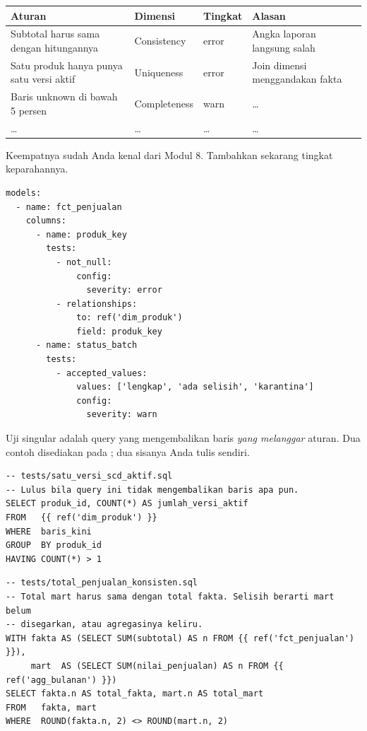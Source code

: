 \begin{center}
\small
\begin{tabular}{@{}p{}p{}p{}>{\raggedright\arraybackslash}p{}@{}}
\toprule
\textbf{Aturan} & \textbf{Dimensi} & \textbf{Tingkat} & \textbf{Alasan} \\
\midrule
Subtotal harus sama dengan hitungannya & Consistency & error &
  Angka laporan langsung salah \\
Satu produk hanya punya satu versi aktif & Uniqueness & error &
  Join dimensi menggandakan fakta \\
Baris unknown di bawah 5 persen & Completeness & warn &
  \ldots \\
\ldots & \ldots & \ldots & \ldots \\
\bottomrule
\end{tabular}
\end{center}


Keempatnya sudah Anda kenal dari Modul 8. Tambahkan sekarang tingkat
keparahannya.

\begin{lstlisting}[style=yamlgaya]
models:
  - name: fct_penjualan
    columns:
      - name: produk_key
        tests:
          - not_null:
              config:
                severity: error
          - relationships:
              to: ref('dim_produk')
              field: produk_key
      - name: status_batch
        tests:
          - accepted_values:
              values: ['lengkap', 'ada selisih', 'karantina']
              config:
                severity: warn
\end{lstlisting}


Uji singular adalah query yang mengembalikan baris \emph{yang melanggar}
aturan. Dua contoh disediakan pada ; dua sisanya
Anda tulis sendiri.

\begin{lstlisting}[style=sqlgaya]
-- tests/satu_versi_scd_aktif.sql
-- Lulus bila query ini tidak mengembalikan baris apa pun.
SELECT produk_id, COUNT(*) AS jumlah_versi_aktif
FROM   {{ ref('dim_produk') }}
WHERE  baris_kini
GROUP  BY produk_id
HAVING COUNT(*) > 1
\end{lstlisting}

\begin{lstlisting}[style=sqlgaya]
-- tests/total_penjualan_konsisten.sql
-- Total mart harus sama dengan total fakta. Selisih berarti mart belum
-- disegarkan, atau agregasinya keliru.
WITH fakta AS (SELECT SUM(subtotal) AS n FROM {{ ref('fct_penjualan') }}),
     mart  AS (SELECT SUM(nilai_penjualan) AS n FROM {{ ref('agg_bulanan') }})
SELECT fakta.n AS total_fakta, mart.n AS total_mart
FROM   fakta, mart
WHERE  ROUND(fakta.n, 2) <> ROUND(mart.n, 2)
\end{lstlisting}

